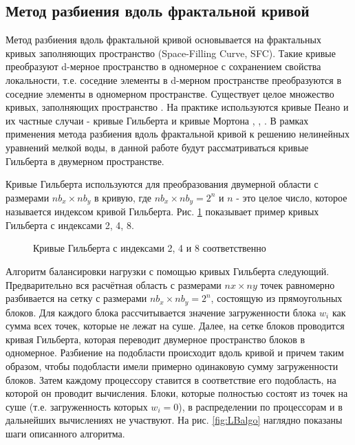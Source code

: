\subsection{Метод разбиения вдоль фрактальной кривой}

Метод разбиения вдоль фрактальной кривой основывается на фрактальных кривых заполняющих пространство (Space-Filling Curve, SFC).
Такие кривые преобразуют d-мерное пространство в одномерное с сохранением свойства локальности,
т.е. соседние элементы в d-мерном пространстве преобразуются в соседние элементы в одномерном пространстве.
Существует целое множество кривых, заполняющих пространство \cite{SFC1994}. 
На практике используются кривые Пеано и их частные случаи - кривые Гильберта и кривые Мортона \cite{Dennis2007}, \cite{Hui2017}, \cite{gmd-7-267-2014}.
В рамках применения метода разбиения вдоль фрактальной кривой к решению нелинейных уравнений мелкой воды, 
в данной работе будут рассматриваться кривые Гильберта в двумерном пространстве.
    
Кривые Гильберта используются для преобразования двумерной области с размерами $nb_x \times nb_y$ в кривую, где
$nb_x \times nb_y = 2^n$ и $n$ - это целое число, которое называется индексом кривой Гильберта.
Рис. \ref{fig:HC} показывает пример кривых Гильберта с индексами 2, 4, 8.
    
    \begin{figure}[htb!]
    \begin{minipage}[h]{0.3\linewidth}
    \end{minipage}
    \hfill
    \begin{minipage}[h]{0.3\linewidth}
    \end{minipage}
    \hfill
    \begin{minipage}[h]{0.3\linewidth}
    \end{minipage}
    \caption{Кривые Гильберта с индексами 2, 4 и 8 соответственно}
    \label{fig:HC}
    \end{figure}
    
Алгоритм балансировки нагрузки с помощью кривых Гильберта следующий. 
Предварительно вся расчётная область с размерами $nx \times ny$ точек равномерно разбивается
на сетку с размерами $nb_x \times nb_y = 2^n$, состоящую из прямоугольных блоков.
Для каждого блока рассчитывается значение загруженности блока $w_i$ как сумма всех точек, которые не лежат на суше.
Далее, на сетке блоков проводится кривая Гильберта, которая переводит
двумерное пространство блоков в одномерное.
Разбиение на подобласти происходит вдоль кривой и причем таким образом, чтобы
подобласти имели примерно одинаковую сумму загруженности блоков.
Затем каждому процессору ставится в соответствие его подобласть, на которой он проводит вычисления.
Блоки, которые полностью состоят из точек на суше (т.е. загруженность которых $w_i = 0$),
в распределении по процессорам и в дальнейших вычислениях не участвуют. 
На рис. \ref{fig:LBalgo} наглядно показаны шаги описанного алгоритма. 

